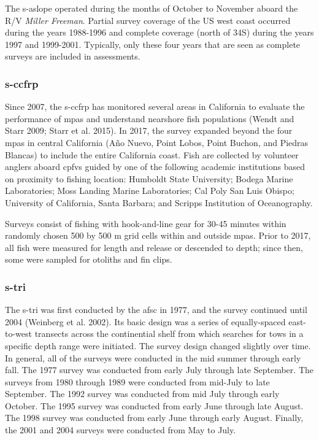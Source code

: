 \documentclass[11pt,
  english,
  letterpaper,
]{article}
\begin{document}
The \gls{s-aslope} operated during the months of October to November aboard the R/V \emph{Miller Freeman}. Partial survey coverage of the US west coast occurred during the years 1988-1996 and complete coverage (north of 34\textquotesingle S) during the years 1997 and 1999-2001. Typically, only these four years that are seen as complete surveys are included in assessments.

\hypertarget{section-1}{%
\subsubsection{\texorpdfstring{\acrlong{s-ccfrp}}{}}\label{section-1}}

Since 2007, the \gls{s-ccfrp} has monitored several areas in California to evaluate the performance of \glspl{mpa} and understand nearshore fish populations (Wendt and Starr 2009; Starr et al. 2015). In 2017, the survey expanded beyond the four \Gls{mpa}s in central California (Año Nuevo, Point Lobos, Point Buchon, and Piedras Blancas) to include the entire California coast. Fish are collected by volunteer anglers aboard \glspl{cpfv} guided by one of the following academic institutions based on proximity to fishing location: Humboldt State University; Bodega Marine Laboratories; Moss Landing Marine Laboratories; Cal Poly San Luis Obispo; University of California, Santa Barbara; and Scripps Institution of Oceanography.

Surveys consist of fishing with hook-and-line gear for 30-45 minutes within randomly chosen 500 by 500 m grid cells within and outside \glspl{mpa}. Prior to 2017, all fish were measured for length and release or descended to depth; since then, some were sampled for otoliths and fin clips.

\hypertarget{section-2}{%
\subsubsection{\texorpdfstring{\acrlong{s-tri}}{}}\label{section-2}}

The \gls{s-tri} was first conducted by the \gls{afsc} in 1977, and the survey continued until 2004 (Weinberg et al. 2002). Its basic design was a series of equally-spaced east-to-west transects across the continential shelf from which searches for tows in a specific depth range were initiated. The survey design changed slightly over time. In general, all of the surveys were conducted in the mid summer through early fall. The 1977 survey was conducted from early July through late September. The surveys from 1980 through 1989 were conducted from mid-July to late September. The 1992 survey was conducted from mid July through early October. The 1995 survey was conducted from early June through late August. The 1998 survey was conducted from early June through early August. Finally, the 2001 and 2004 surveys were conducted from May to July.
\end{document}
